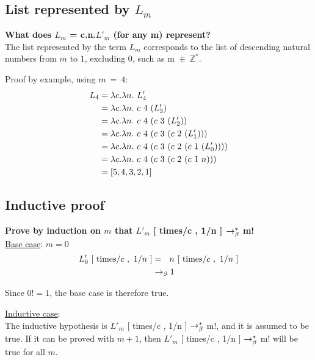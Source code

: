 \documentclass{article}
\begin{document}
	\begin{Large}
	
	\subsection{List represented by $L_m$}
	
		\textbf{What does $L_m$ = \lamb c.\lamb n.$L'_m$ (for any m) represent?}\\
		
		The list represented by the term $L_m$ corresponds to the list of descending natural numbers from $m$ to $1$, excluding 0, such as m $\in \ \mathbb{Z}^*$.
		\newline
		
		Proof by example, using $m \ = \ 4$:
		\begin{align*}
			L_4 &= \la c.\la n. \ L_4^\prime \\
			&= \la c.\la n. \ c \  4 \ ( L_3^\prime ) \\
			&= \la c.\la n. \ c \  4 \ ( c \ 3 \ (L_2^\prime )) \\
			&= \la c.\la n. \ c \  4 \ ( c \ 3 \ (c \ 2 \ (L_1^\prime ))) \\
			&= \la c.\la n. \ c \  4 \ ( c \ 3 \ (c \ 2 \ (c \ 1 \ (L_0^\prime )))) \\
			&= \la c.\la n. \ c \  4 \ ( c \ 3 \ (c \ 2 \ (c \ 1 \ n))) \\
			&= [5,4,3,2,1]
		\end{align*}
		\newline
		
	\subsection{Inductive proof}

		\textbf{Prove by induction on $m$ that $L'_m$ [ times/c , 1/n ] $\rightarrow_\beta^*$  m!}\\
		
		\underline{Base case}: $m=0$
		\begin{align*}
			L_0^\prime \ [\ \tim / c \ , \ 1/n \ ] &= \saq n \ [\ \tim / c \ , \ 1/n \ ] \\
			&\equals 1
		\end{align*}
		
		Since $0! = 1$, the base case is therefore true.
		\newline
		
		\underline{Inductive case}: \\
		
		The inductive hypothesis is $L'_m$ [ times/c , 1/n ] $\rightarrow_\beta^*$  m!, and it is assumed to be true.
		If it can be proved with $m+1$, then $L'_m$ [ times/c , 1/n ] $\rightarrow_\beta^*$  m! will be true for all $m$.
		

\end{Large}
\end{document}
